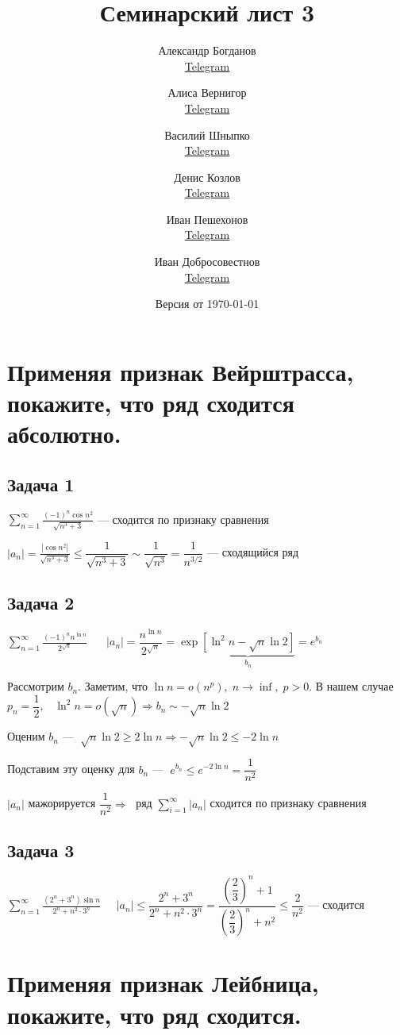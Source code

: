 \documentclass[a4paper,fleqn]{article}
\title{Семинарский лист 3}
\author{
	Александр Богданов \\ \href{https://t.me/SphericalPotatoInVacuum}{Telegram} \and
	Алиса Вернигор     \\ \href{https://t.me/allisyonok}{Telegram} \and
	Василий Шныпко     \\ \href{https://t.me/yourvash}{Telegram} \and
	Денис Козлов       \\ \href{https://t.me/DKozl50}{Telegram} \and
	Иван Пешехонов     \\ \href{https://t.me/JohanDDC}{Telegram}\and
	Иван Добросовестнов \\ \href{https://t.me/ivankot13}{Telegram}
}
\date{Версия от {\ddmmyyyydate\today} \currenttime}
\begin{document}
	\maketitle
	\section*{Применяя признак Вейрштрасса, покажите, что ряд сходится абсолютно.}
	\subsection*{Задача 1}
		 $ \sum_{n=1}^{\infty} \frac{(-1)^{n} \cos n^{2}}{\sqrt{n^{3}+3}} $ --- сходится по признаку сравнения
		
		$ |a_n| = \frac{|\cos n^{2}|}{\sqrt{n^{3}+3}} \leq \dfrac{1}{\sqrt{n^{3}+3}} \sim \dfrac{1}{\sqrt{n^3}} = \dfrac{1}{n^{3/2}} $ --- сходящийся ряд
	
	\subsection*{Задача 2}
		$ \sum_{n=1}^{\infty} \frac{(-1)^{n} n^{\ln n}}{2^{\sqrt{n}}} $
		$\; \; \; \; \;  |a_n| = \dfrac{n^{\ln n}}{2^{\sqrt{n}}} = \exp \underbrace{\left[\ln^2 n - \sqrt{n}\ln 2\right]}_{b_n}  = e^{b_n}$
		
		Рассмотрим $ b_n $.
		Заметим, что $ \ln n  = o(n^p), \; n \to \inf, \; p>0$. В нашем случае $ p_n = \dfrac{1}{2}, \; \; \; \ln^2n = o(\sqrt{n}) \Rightarrow b_n \sim -\sqrt{n}\ln 2$ 
		
		Оценим $ b_n $   --- $ \; \sqrt{n}\ln2 \geq 2 \ln n \Rightarrow -\sqrt{n}\ln 2 \leq -2\ln n$
		
		Подставим эту оценку для $ b_n $ --- $\; e^{b_n} \leq e^{-2\ln n}  = \dfrac{1}{n^2}$ 
		
		$ |a_n| $ мажорируется $ \dfrac{1}{n^2} \Rightarrow \;$ ряд $ \sum_{i = 1}^{\infty} |a_n|$ сходится по признаку сравнения 
	\subsection*{Задача 3}
		$ \sum_{n=1}^{\infty} \frac{\left(2^{n}+3^{n}\right) \sin n}{2^{n}+n^{2} \cdot 3^{n}} \; \; \; \; \; |a_n| \leq \dfrac{2^n + 3^n}{2^n + n^2\cdot 3^n}  = \dfrac{\left(\dfrac{2}{3}\right)^n+1 }{\left(\dfrac{2}{3}\right)^n + n^2} \leq\dfrac{2}{n^2}$ --- сходится
	\section*{Применяя признак Лейбница, покажите, что ряд сходится.}
	
\end{document}
